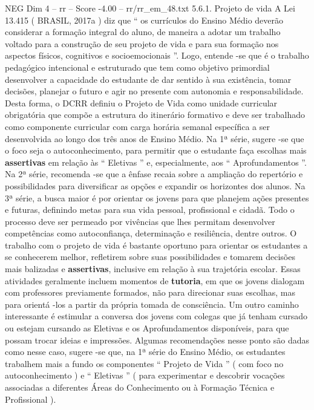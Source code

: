 \begin{textsample}{NEG Dim 4 – rr – Score -4.00 – rr/rr\_em\_48.txt}  \label{ex:f4_neg_172}
5.6.1.
Projeto de vida A Lei 13.415 ( BRASIL, 2017a ) diz que “ os currículos do Ensino Médio deverão considerar a formação integral do aluno, de maneira a adotar um trabalho voltado para a construção de seu projeto de vida e para sua formação nos aspectos físicos, cognitivos e socioemocionais ”.
Logo, entende -se que é o trabalho pedagógico intencional e estruturado que tem como objetivo primordial desenvolver a capacidade do estudante de dar sentido à sua existência, tomar decisões, planejar o futuro e agir no presente com autonomia e responsabilidade.
Desta forma, o DCRR definiu o Projeto de Vida como unidade curricular obrigatória que compõe a estrutura do itinerário formativo e deve ser trabalhado como componente curricular com carga horária semanal específica a ser desenvolvida ao longo dos três anos de Ensino Médio.
Na 1ª série, sugere -se que o foco seja o autoconhecimento, para permitir que o estudante faça escolhas mais \textbf{assertivas} em relação às “ Eletivas ” e, especialmente, aos “ Aprofundamentos ”.
Na 2ª série, recomenda -se que a ênfase recaia sobre a ampliação do repertório e possibilidades para diversificar as opções e expandir os horizontes dos alunos.
Na 3ª série, a busca maior é por orientar os jovens para que planejem ações presentes e futuras, definindo metas para sua vida pessoal, profissional e cidadã.
Todo o processo deve ser permeado por vivências que lhes permitam desenvolver competências como autoconfiança, determinação e resiliência, dentre outros.
O trabalho com o projeto de vida é bastante oportuno para orientar os estudantes a se conhecerem melhor, refletirem sobre suas possibilidades e tomarem decisões mais balizadas e \textbf{assertivas}, inclusive em relação à sua trajetória escolar.
Essas atividades geralmente incluem momentos de \textbf{tutoria}, em que os jovens dialogam com professores previamente formados, não para direcionar suas escolhas, mas para orientá -los a partir da própria tomada de consciência.
Um outro caminho interessante é estimular a conversa dos jovens com colegas que já tenham cursado ou estejam cursando as Eletivas e os Aprofundamentos disponíveis, para que possam trocar ideias e impressões.
Algumas recomendações nesse ponto são dadas como nesse caso, sugere -se que, na 1ª série do Ensino Médio, os estudantes trabalhem mais a fundo os componentes “ Projeto de Vida ” ( com foco no autoconhecimento ) e “ Eletivas ” ( para experimentar e descobrir vocações associadas a diferentes Áreas do Conhecimento ou à Formação Técnica e Profissional ).

\end{textsample}
